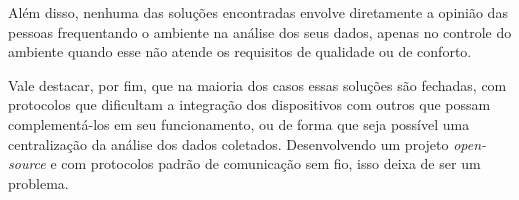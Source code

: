 \documentclass[monografia.tex]{subfiles}
\begin{document}
Além disso, nenhuma das soluções encontradas envolve diretamente a opinião das pessoas frequentando o ambiente na análise dos seus dados, apenas no controle do ambiente quando esse não atende os requisitos de qualidade ou de conforto. 

Vale destacar, por fim, que na maioria dos casos essas soluções são fechadas, com protocolos que dificultam a integração dos dispositivos com outros que possam complementá-los em seu funcionamento, ou de forma que seja possível uma centralização da análise dos dados coletados. Desenvolvendo um projeto \textit{open-source} e com protocolos padrão de comunicação sem fio, isso deixa de ser um problema. 
\end{document}
